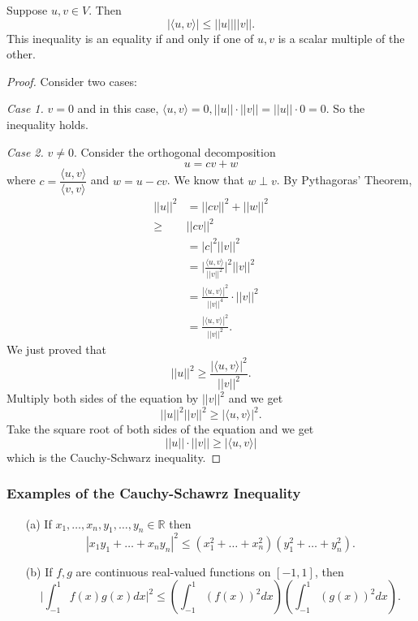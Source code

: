 \documentclass[11pt]{article}
\begin{document}
    Suppose \(u,v \in V\). Then \[|\langle u,v \rangle| \leq ||u|| ||v||.\] This inequality is an equality if and only if one of $u,v$ is a scalar multiple of the other. 
    \begin{proof}
        Consider two cases:

        \vspace{1em}
        
        \emph{Case 1.} \(v = 0\) and in this case, \(\langle u,v \rangle = 0, ||u|| \cdot ||v|| = || u || \cdot 0 = 0.\) So the inequality holds.

        \vspace{1em}

        \emph{Case 2.} \(v \neq 0\). Consider the orthogonal decomposition \[u = cv + w\] where \(c = \dfrac{\langle u,v \rangle}{\langle v,v \rangle}\) and \(w = u - cv\). We know that \(w \perp v\). By Pythagoras' Theorem,
        \begin{align*}
            ||u||^2 &= ||cv||^2 + ||w||^2 \\
                    \geq& ||cv||^2 \\
                    &= |c|^2 ||v||^2 \\
                    &= \bigg|\frac{\langle u,v \rangle}{||v||^2}\bigg|^2 ||v||^2 \\
                    &= \frac{| \langle u,v \rangle |^2}{||v||^4} \cdot ||v||^2 \\
                    &= \frac{|\langle u,v \rangle|^2}{||v||^2}.
        \end{align*}
        We just proved that \[||u||^2 \geq \frac{| \langle u,v \rangle|^2}{||v||^2}.\] Multiply both sides of the equation by \(||v||^2\) and we get \[||u||^2 ||v||^2 \geq | \langle u,v \rangle |^2.\] Take the square root of both sides of the equation and we get \[||u|| \cdot ||v|| \geq | \langle u,v \rangle |\] which is the Cauchy-Schwarz inequality. 
    \end{proof}

    \subsubsection{Examples of the Cauchy-Schawrz Inequality}

    \begin{enumerate}
        \item[(a)] If \(x_1, \dots, x_n, y_1, \dots, y_n \in \mathbb{R}\) then \[|x_1 y_1 + \dots + x_n y_n|^2 \leq (x_1^2 + \dots + x_n^2)(y_1^2 + \dots + y_n^2).\] 
        \item[(b)] If $f,g$ are continuous real-valued functions on \([-1,1]\), then \[\bigg| \int_{-1}^{1} f(x)g(x)dx \bigg|^2 \leq \left( \int_{-1}^{1} (f(x))^2 dx \right) \left( \int_{-1}^{1} (g(x))^2 dx \right).\] 
    \end{enumerate}
\end{document}
